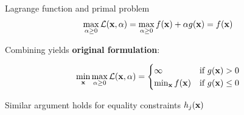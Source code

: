\documentclass[11pt,compress,t,notes=noshow, xcolor=table]{beamer}
\begin{document}
\begin{vbframe}{Lagrange function and primal problem}
\begin{equation*}
	\max_{\alpha \ge 0} \mathcal{L}(\mathbf{x}, \alpha) = \max_{\alpha \ge 0} f(\mathbf{x}) +  \alpha g(\mathbf{x}) = f(\mathbf{x})
\end{equation*}

\medskip

Combining yields \textbf{original formulation}:

\begin{equation*}
	\min_{\mathbf{x}} \max_{\alpha \ge 0} \mathcal{L}(\mathbf{x}, \alpha) =
    \begin{cases}
        \infty & \text{if } g(\mathbf{x}) > 0 \\
        \min_{\mathbf{x}} f(\mathbf{x}) & \text{if }  g(\mathbf{x}) \le 0
    \end{cases}
\end{equation*}

Similar argument holds for equality constraints $h_j(\mathbf{x})$

\end{vbframe}
\end{document}
